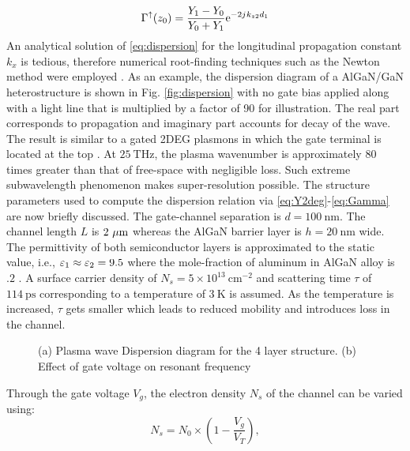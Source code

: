\documentclass[11pt]{article}
\begin{document}
%
\begin{equation}
  \Gamma^{\uparrow}(z_0) = \frac{Y_1 - Y_0}{Y_0 + Y_1} \mathrm{e}^{-2j\mkern1mu k_{z2}d_1}
  \label{eq:Gamma}
\end{equation}
%
An analytical solution of \eqref{eq:dispersion} for the longitudinal propagation constant $k_x$ is tedious, therefore numerical root-finding techniques such as the Newton method were employed \cite{9780521880688}. As an example, the dispersion diagram of a AlGaN/GaN heterostructure is shown in Fig. \ref{fig:dispersion} with no gate bias applied along with a light line that is multiplied by a factor of 90 for illustration. The real part corresponds to propagation and imaginary part accounts for decay of the wave. The result is similar to a gated 2DEG plasmons in which the gate terminal is located at the top \cite{Nakayama1974, Eguiluz1975}. At $25~\mathrm{THz}$, the plasma wavenumber is approximately 80 times greater than that of free-space with negligible loss. Such extreme subwavelength phenomenon makes super-resolution possible. The structure parameters used to compute the dispersion relation via \eqref{eq:Y2deg}-\eqref{eq:Gamma} are now briefly discussed. The gate-channel separation is $d = 100~\mathrm{nm}$. The channel length $L$ is $2~\mathrm{\mu m}$ whereas the AlGaN barrier layer is $h = 20~ \mathrm{nm}$ wide.
The permittivity of both semiconductor layers is approximated to the static value, i.e., $\varepsilon_1 \approx \varepsilon_2 = 9.5$ where the mole-fraction of aluminum in AlGaN alloy is $.2$ \cite{Muravjov2010}. A surface carrier density of $N_s = 5 \times 10^{13}~ \mathrm{cm}^{-2}$ and scattering time $\tau$ of $114~ \mathrm{ps}$ corresponding to a temperature of $3~ \mathrm{K}$ is assumed. As the temperature is increased, $\tau$ gets smaller which leads to reduced mobility and introduces loss in the channel.
%
\begin{figure}[t!]
      \hfil
  \caption{(a) Plasma wave Dispersion diagram for the 4 layer structure. (b) Effect of gate voltage on resonant frequency}
  \label{fig:matlab_simulation}
\end{figure}
%
Through the gate voltage $V_g$, the electron density $N_s$ of the channel can be varied using:
%
\begin{equation}
  N_s = N_0 \times \left(1 - \frac{V_g}{V_T} \right),
  \label{eq:tunability}
\end{equation}
\end{document}
